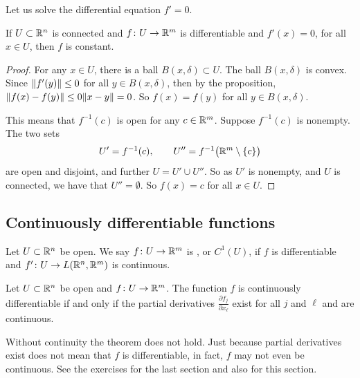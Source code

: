 Let us solve the differential equation $f' = 0$.

\begin{cor}
If $U \subset {\mathbb{R}}^n$ is connected and $f \colon U \to {\mathbb{R}}^m$ is differentiable
and $f'(x) = 0$, for all $x \in U$, then $f$ is constant.
\end{cor}

\begin{proof}
For any $x \in U$, there is a ball $B(x,\delta) \subset U$.  The ball
$B(x,\delta)$ is convex.  Since
$\lVert {f'(y)} \rVert \leq 0$ for all $y \in B(x,\delta)$, then by the proposition,
$\lVert {f(x)-f(y)} \rVert \leq 0 \lVert {x-y} \rVert = 0$.  So $f(x) = f(y)$ for all $y \in
B(x,\delta)$.

This means that $f^{-1}(c)$ is open for any $c \in {\mathbb{R}}^m$.  Suppose
$f^{-1}(c)$ is nonempty.  
The two sets
\begin{equation*}
U' = f^{-1}(c), \qquad U'' = f^{-1}\bigl({\mathbb{R}}^m\setminus\{c\}\bigr)
\end{equation*}
are open and disjoint, and further $U = U' \cup U''$.  So as $U'$ is nonempty,
and $U$ is connected,
we have that $U'' = \emptyset$.  So $f(x) = c$ for all $x \in U$.
\end{proof}

\subsection{Continuously differentiable functions}

\begin{defn}
Let $U \subset {\mathbb{R}}^n$ be open.
We say $f \colon U \to {\mathbb{R}}^m$ is
\emph{},
or $C^1(U)$,
if $f$ is differentiable and $f' \colon U \to L({\mathbb{R}}^n,{\mathbb{R}}^m)$
is continuous.
\end{defn}

\begin{prop} \label{mv:prop:contdiffpartials}
Let $U \subset {\mathbb{R}}^n$ be open and
$f \colon U \to {\mathbb{R}}^m$.  The function
$f$ is continuously differentiable if and only if 
the partial derivatives $\frac{\partial f_j}{\partial x_\ell}$
exist for all $j$ and $\ell$ and are continuous.
\end{prop}

Without continuity the theorem does not hold.  Just because
partial derivatives exist does not mean that $f$ is differentiable,
in fact, $f$ may not even be continuous.  See the exercises
for the last section and also for this section.

